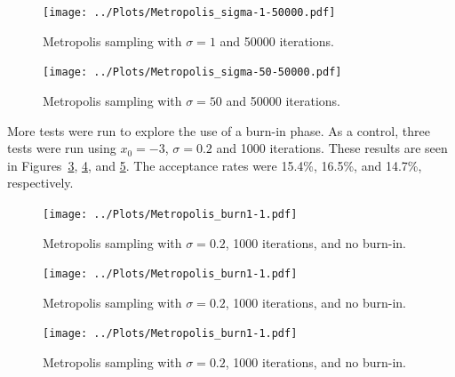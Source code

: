 \documentclass[twocolumn]{myarticle}
\begin{document}
\begin{figure}[ht!]
    \begin{center}
    \texttt{[image: ../Plots/Metropolis\_sigma-1-50000.pdf]}
    \caption{%
    Metropolis sampling with $ \sigma = 1 $ and 50000 iterations.
    }
    \label{fig:metropolis_sigma_1_50000}
    \end{center}
\end{figure}

\begin{figure}[ht!]
    \begin{center}
    \texttt{[image: ../Plots/Metropolis\_sigma-50-50000.pdf]}
    \caption{%
    Metropolis sampling with $ \sigma = 50 $ and 50000 iterations.
    }
    \label{fig:metropolis_sigma_50_50000}
    \end{center}
\end{figure}

More tests were run to explore the use of a burn-in phase.
As a control, three tests were run using $ x_0 = -3 $, $ \sigma = 0.2 $ and 1000 iterations.
These results are seen in Figures~\ref{fig:metropolis_burn_1_1}, \ref{fig:metropolis_burn_1_2}, and \ref{fig:metropolis_burn_1_3}.
The acceptance rates were 15.4\%, 16.5\%, and 14.7\%, respectively.

\begin{figure}[ht!]
    \begin{center}
    \texttt{[image: ../Plots/Metropolis\_burn1-1.pdf]}
    \caption{%
    Metropolis sampling with $ \sigma = 0.2 $, 1000 iterations, and no burn-in.
    }
    \label{fig:metropolis_burn_1_1}
    \end{center}
\end{figure}

\begin{figure}[ht!]
    \begin{center}
    \texttt{[image: ../Plots/Metropolis\_burn1-1.pdf]}
    \caption{%
    Metropolis sampling with $ \sigma = 0.2 $, 1000 iterations, and no burn-in.
    }
    \label{fig:metropolis_burn_1_2}
    \end{center}
\end{figure}

\begin{figure}[ht!]
    \begin{center}
    \texttt{[image: ../Plots/Metropolis\_burn1-1.pdf]}
    \caption{%
    Metropolis sampling with $ \sigma = 0.2 $, 1000 iterations, and no burn-in.
    }
    \label{fig:metropolis_burn_1_3}
    \end{center}
\end{figure}
\end{document}
